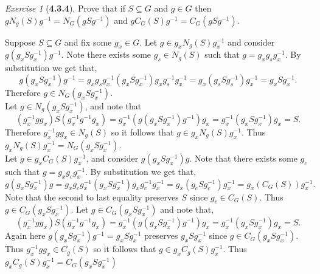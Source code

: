 \documentclass[12pt]{amsart}
\makeatletter
\theoremstyle{remark}
\newtheorem*{exercise}{Exercise}%
\renewenvironment{proof}[1][\proofname]{\par\doublespacing
  \pushQED{\qed}%
  \normalfont \topsep6\p@\@plus6\p@\relax
  \list{}{%
    \settowidth{\leftmargin}{\itshape\proofname:\hskip\labelsep}%
    \setlength{\labelwidth}{0pt}%
    \setlength{\itemindent}{-\leftmargin}%
  }%
  \item[\hskip\labelsep\itshape#1\@addpunct{:}]\ignorespaces
}{%
  \popQED\endlist\@endpefalse
  \singlespacing
}
\theoremstyle{mycomment}
\makeatother
\begin{document}
\begin{exercise}[\textbf{4.3.4}] Prove that if $S \subseteq G$ and $g \in G$ then $gN_g(S)g^{-1} = N_G(gSg^{-1})$ and $gC_G(S)g^{-1} = C_G(gSg^{-1})$.
  \begin{proof}Suppose $S \subseteq G$ and fix some $g_x \in G$. Let $g \in g_xN_g(S)g_x^{-1}$ and 
    consider $g(g_xSg_x^{-1})g^{-1}$. Note there exists some $g_s \in N_g(S)$ such that $g = g_xg_sg_x^{-1}$. By substitution we get that,
    \begin{equation*}
      g(g_xSg_x^{-1})g^{-1} = g_xg_sg_x^{-1}(g_xSg_x^{-1})g_xg_s^{-1}g_x^{-1} = g_x(g_sSg_s^{-1})g_x^{-1} = g_xSg_x^{-1}.
    \end{equation*} 
    Therefore $g \in N_G(g_xSg_x^{-1})$.\\
    Let $g \in N_g(g_xSg_x^{-1})$, and note that 
    \begin{equation*}
      (g_x^{-1}gg_x)S(g_x^{-1}g^{-1}g_x) = g_x^{-1}(g(g_xSg_x^{-1})g^{-1})g_x = g_x^{-1}(g_xSg_x^{-1})g_x = S.
    \end{equation*} 
    Therefore $g_x^{-1}gg_x \in N_g(S)$ so it follows that $g \in g_xN_g(S)g_x^{-1}$. Thus $g_xN_g(S)g_x^{-1} = N_G(g_xSg_x^{-1})$.\\


    Let $g \in g_xC_G(S)g_x^{-1}$, and consider $g(g_xSg_x^{-1})g$. Note that there exists some $g_c$ such that $g = g_xg_cg_x^{-1}$. By substitution we get that, 
    \begin{equation*}
      g(g_xSg_x^{-1})g = g_xg_cg_x^{-1}(g_xSg_x^{-1})g_xg_c^{-1}g_x^{-1} = g_x(g_cSg_c^{-1})g_x^{-1} = g_x(C_G(S))g_x^{-1}.
    \end{equation*}
    Note that the second to last equality preserves $S$ since $g_c \in C_G(S)$. Thus $g \in C_G(g_xSg_x^{-1})$.
    Let $g \in C_G(g_xSg_x^{-1})$ and note that,
    \begin{equation*}
      (g_x^{-1}gg_x)S(g_x^{-1}g^{-1}g_x) = g_x^{-1}(g(g_xSg_x^{-1})g^{-1})g_x = g_x^{-1}(g_xSg_x^{-1})g_x = S.
    \end{equation*}
    Again here $g(g_xSg_x^{-1})g^{-1} = g_xSg_x^{-1}$ preserves $g_xSg_x^{-1}$ since $g \in C_G(g_xSg_x^{-1})$. Thus $g_x^{-1}gg_x \in C_g(S)$ so it follows that $g \in g_xC_g(S)g_x^{-1}$. Thus $g_xC_g(S)g_x^{-1} = C_G(g_xSg_x^{-1})$
  \end{proof}
\end{exercise}
\vspace{.15in}
\end{document}

